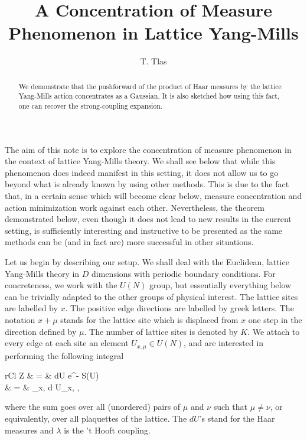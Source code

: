 \documentclass[twoside, a4paper,10pt]{article}
\title{A Concentration of Measure Phenomenon in Lattice Yang-Mills}
\author{T. Tlas}
\date{}
\def \ni{\noindent}
\newcommand{\besn}{\begin{IEEEeqnarray*}{rCl}}
\newcommand{\eesn}{\end{IEEEeqnarray*}}
\newcommand{\txt}{\textrm}
\newcommand{\tr}{\txt{Tr}}
\begin{document}
\maketitle
\thispagestyle{empty}

\begin{abstract}
\ni We demonstrate that the pushforward of the product of Haar measures by the lattice Yang-Mills action concentrates as a Gaussian. It is also sketched how using this fact, one can recover the strong-coupling expansion. \newline
\end{abstract}


The aim of this note is to explore the concentration of measure phenomenon \cite{ledoux} in the context of lattice Yang-Mills theory. We shall see below that while this phenomenon does indeed manifest in this setting, it does not allow us to go beyond what is already known by using other methods. This is due to the fact that, in a certain sense which will become clear below, measure concentration and action minimization work against each other. Nevertheless, the theorem demonstrated below, even though it does not lead to new results in the current setting, is sufficiently interesting and instructive to be presented as the same methods can be (and in fact are) more successful in other situations. \newline



Let us begin by describing our setup. We shall deal with the Euclidean, lattice Yang-Mills theory in $D$ dimensions with periodic boundary conditions. For concreteness, we work with the $U(N)$ group, but essentially everything below can be trivially adapted to the other groups of physical interest. The lattice sites are labelled by $x$. The positive edge directions are labelled by greek letters. The notation $x + \mu$ stands for the lattice site which is displaced from $x$ one step in the direction defined by $\mu$. The number of lattice sites is denoted by $K$. We attach to every edge at each site an element $U_{x, \mu} \in U(N)$, and are interested in performing the following integral

\besn
Z &  =  &  \int dU e^{- \beta S(U)} \\
& = &  \int \prod_{x, \mu} d U_{x, \mu} \exp \Bigg  [  \frac{2 N^2}{\lambda} \sum_{\{\mu, \nu\}} \frac{1}{N} \Re \Big ( \tr \big ( U^\dagger_{x, \nu} U^\dagger_{x  + \nu, \mu} U_{x +\mu, \nu} U_{x, \mu}  \big )  \Big ) \Bigg ] ,
\eesn

where the sum goes over all (unordered) pairs of $\mu$ and $\nu$ such that $\mu \neq \nu$, or equivalently, over all plaquettes of the lattice. The $dU$'s stand for the Haar measures and $\lambda$ is the 't Hooft coupling. \newline
\end{document}
